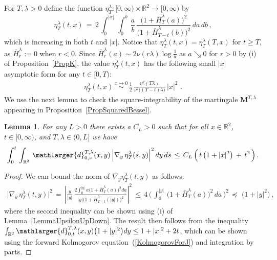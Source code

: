 \documentclass[10pt]{article}
\def\stackrel#1#2{\mathrel{\mathop{#2}\limits^{#1}}}
\numberwithin{equation}{section}
\newtheorem{lemma}[theorem]{Lemma}
\theoremstyle{definition}
\newcommand{\R}{{\mathbb R}}
\begin{document}
For $T,\lambda>0$ define the   function $\eta_{T}^{\lambda}:[0,\infty)\times \R^2\rightarrow [0,\infty)$  by
$$\eta_{T}^{\lambda}(t,x)\,=\,2\,\int_0^{|x|} \, \int_0^b\, \frac{a}{b}\,\frac{\big( 1+\bar{H}_{T}^{\lambda}(a)\big)^2     }{\big( 1+\bar{H}_{T-t}^{\lambda}(b)\big)^2      }\,da\, db \,,  $$
which is increasing in both $t$ and $|x|$. Notice that $\eta_{T}^{\lambda}(t,x)=\eta_{T}^{\lambda}(T,x)$ for $t\geq T$, as $\bar{H}_{r}^{\lambda}:=0$ when $r<0$. Since $\bar{H}_r^{\lambda}(a)\sim 2\nu(r\lambda)\log \frac{1}{a}$ as $a\searrow 0$ for $r>0$  by (i) of Proposition~\ref{PropK},  the value $\eta_{T}^{\lambda}(t,x)$ has the following small $|x|$ asymptotic form  for any  $t\in [0,T)$:
\begin{align}\label{EtaAppox}
    \eta_{T}^{\lambda}(t,x)\,\stackrel{ x\rightarrow 0}{\sim}\,\frac{1}{2}\, \frac{ \nu^2(T\lambda) }{ \nu^2\big((T-t)\lambda \big) } 
 \,|x|^2 \, \,.
\end{align}
 We use the next lemma to check the square-integrability of the martingale $\mathbf{M}^{T,\lambda }$ appearing in Proposition~\ref{PropSquaredBessel}. 
\begin{lemma} \label{LemmaPreSquaredBessel} For any $L>0$ there exists a  $C_L>0$ such that for all $x\in \R^2$, $t\in [0,\infty)$, and $T,\lambda\in (0,L]$  we have
\begin{align*}
 \int_0^t \,\int_{\R^2 }\,   \mathlarger{d}_{0,s}^{T,\lambda}(x,y)\,\Big|  \nabla_y \,\eta_{T}^{\lambda}(s,y)\Big|^2\,dy\,ds \,\leq \, C_L\,\Big(\, t\,\big(1+|x|^2\big)\,+\,t^2  \, \Big)\,.
\end{align*}
    
\end{lemma}
\begin{proof}We can bound the norm of $ \nabla_y \eta_{T}^{\lambda}(t,y) $  as follows:\begin{align*} \Big| \nabla_y \,\eta_{T}^{\lambda}(t,y)\Big|^2\,=\,\left|\frac{y}{|y|}\,\frac{2\int_0^{|y|} a\big( 1+\bar{H}_{T}^{\lambda}(a)\big)^2    da  }{|y| \big( 1+\bar{H}_{T-t}^{\lambda}(|y|)\big)^2   }\right|^2   \,\leq \,4\,\bigg(\,\int_0^{|y|}\, \big( 1+\bar{H}_{T}^{\lambda}(a)\big)^2  \,  da \,\bigg)^2   \,\preceq \,\,\big(1+|y|^2\big)\,,\end{align*}
where the second inequality can be shown using (i) of Lemma~\ref{LemmaUpsilonUpDown}.  The result then follows  from the inequality $\int_{\R^2 }   \mathlarger{d}_{0,t}^{T,\lambda}(x,y)\big(1+|y|^2\big)dy\leq 1+|x|^2+2t$, which can be shown using the forward Kolmogorov equation~(\ref{KolmogorovForJ}) and integration by parts. \end{proof}
\end{document}
